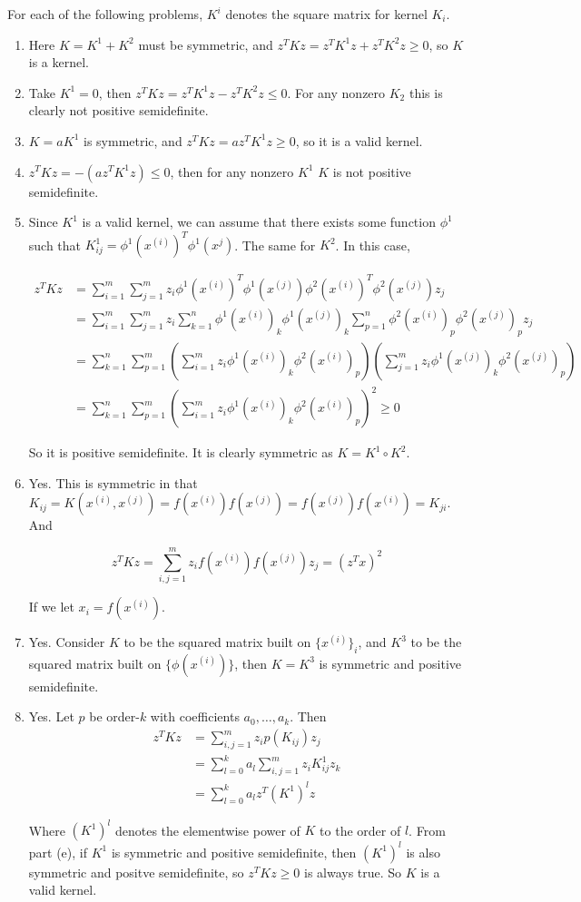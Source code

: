 \begin{answer}
    For each of the following problems, $K^i$ denotes the square matrix for kernel $K_i$.
    \begin{enumerate}
        \item  Here $K = K^1 + K^2$ must be symmetric, and $z^TKz = z^TK^1z + z^TK^2 z \ge 0$, so $K$ is a kernel.
        \item Take $K^1 = 0$, then $z^TKz = z^TK^1z - z^TK^2 z \le 0$. For any nonzero $K_2$ this is clearly not positive semidefinite.
        \item $K = aK^1$ is symmetric, and $z^TKz = az^TK^1z \ge 0$, so it is a valid kernel.
        \item $z^TKz = -(az^TK^1z) \le 0$, then for any nonzero $K^1$ $K$ is not positive semidefinite.
        \item Since $K^1$ is a valid kernel, we can assume that there exists some function $\phi^1$ such that $K^1_{ij} = \phi^1(x^{(i)})^T \phi^1(x^{j})$. The same for $K^2$. In this case, 

            $$
        \begin{aligned}
z^TK z &= \sum_{i=1}^m\sum_{j=1}^m z_i\phi^1(x^{(i)})^T\phi^1(x^{(j)})\phi^2(x^{(i)})^T\phi^2(x^{(j)})z_j\\
&=\sum_{i=1}^m\sum_{j=1}^m z_i\sum_{k=1}^n\phi^1(x^{(i)})_k\phi^1(x^{(j)})_k\sum_{p=1}^n\phi^2(x^{(i)})_p\phi^2(x^{(j)})_pz_j\\
&=\sum_{k=1}^n\sum_{p=1}^m (\sum_{i=1}^mz_i\phi^1(x^{(i)})_k\phi^2(x^{(i)})_p)(\sum_{j=1}^mz_i\phi^1(x^{(j)})_k\phi^2(x^{(j)})_p)\\
&=\sum_{k=1}^n\sum_{p=1}^m (\sum_{i=1}^mz_i\phi^1(x^{(i)})_k\phi^2(x^{(i)})_p)^2 \ge 0
\end{aligned}
$$

    So it is positive semidefinite. It is clearly symmetric as $K = K^1 \circ K^2$.
\item Yes. This is symmetric in that $K_{ij} = K(x^{(i)}, x^{(j)}) = f(x^{(i)})f(x^{(j)}) = f(x^{(j)})f(x^{(i)}) = K_{ji}$. And

    $$
    z^TKz = \sum_{i,j=1}^m z_if(x^{(i)})f(x^{(j)}) z_j= (z^Tx)^2
    $$

    If we let $x_i = f(x^{(i)})$.
\item Yes. Consider $K$ to be the squared matrix built on $\{x^{(i)}\}_i$, and $K^3$ to be the squared matrix built on $\{\phi(x^{(i)})\}$, then $K = K^3$ is symmetric and positive semidefinite.
\item Yes. Let $p$ be order-$k$ with coefficients $a_0, \ldots, a_k$. Then
    $$
    \begin{aligned}
z^TKz &= \sum_{i,j=1}^m z_i p(K_{ij}) z_j\\
&= \sum_{l=0}^ka_l\sum_{i,j=1}^m z_iK^1_{ij}z_k\\
&= \sum_{l=0}^ka_lz^T(K^1)^lz
\end{aligned}
$$

    Where $(K^1)^l$ denotes the elementwise power of $K$ to the order of $l$. From part (e), if $K^1$ is symmetric and positive semidefinite, then $(K^1)^l$ is also symmetric and positve semidefinite, so $z^TKz \ge 0$ is always true. So $K$ is a valid kernel.


    \end{enumerate}


\end{answer}
